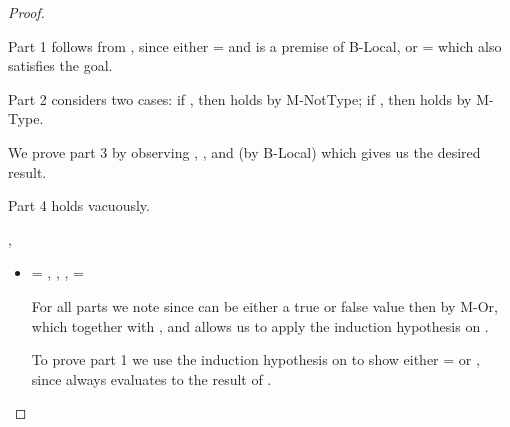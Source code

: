 \begin{lemma}
\begin{proof}
\begin{case}[B-Local]
\begin{itemize}
\begin{subcase}[T-Local]
Part 1 follows from \inopenv{\openv{}}{\object{}} {\val{}}, since either {\object{}} = \x{}
and \inopenv{\openv{}}{\x{}} {\val{}} is a premise of B-Local, or {\object{}} = {\emptyobject{}} which also
satisfies the goal.

Part 2 considers two cases: if \istrueval{\val{}}, then 
\satisfies{\openv{}}{\notprop{\falsy}{\x{}}} holds by M-NotType; if \isfalseval{\val{}}, then 
\satisfies{\openv{}}{\isprop{\falsy}{\x{}}} holds by M-Type.

We prove part 3 by observing
\inpropenv{\propenv{}}{\isprop{\ty{}}{\x{}}},
\satisfies{\openv{}}{\propenv{}},
and
\inopenv {\openv{}} {\x{}} {\val{}}
(by B-Local)
which gives us the desired result.

Part 4 holds vacuously.
\end{subcase}
\end{itemize}

\end{case}

\begin{case}[B-Do]
  \opsem {\openv{}} {} {},
  \opsem {\openv{}} {} {\val{}}

\begin{itemize}
  \item[] \begin{subcase}[T-Do]
      \ep{} = { {}},
  \judgementrewrite {\propenv{}} 
             {} {}
             { {}} 
             {}
             {},
           {\ep{}} {\ty{}}
           {\filterset {\thenprop {\prop{}}} {\elseprop {\prop{}}}} 
           {\object{}}
           {\e{}},
    \e{} = { {}}

For all parts we note 
    since {} can be either a true or false value
    then
    {}
    by M-Or,
    which together with 
           {} {\ty{}}
           {\filterset {\thenprop {\prop{}}} {\elseprop {\prop{}}}} 
           {\object{}},
    and
  \opsem {\openv{}} {} {\val{}}
    allows us to apply the induction hypothesis on .

To prove part 1 we use the induction hypothesis on 
to show either \object{} = \emptyobject{} 
or \inopenv {\openv{}} {\object{}} {\val{}}, since \e{} always
evaluates to the result of .


\end{subcase}
\end{itemize}
\end{case}
\end{proof}
\end{lemma}
